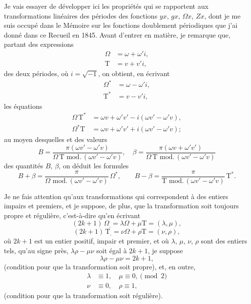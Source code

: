 \documentclass[11pt,a4paper]{article}
\providecommand{\md}{\,\mathrm{mod.}\,}
\begin{document}
Je vais essayer de d\'evelopper ici les propri\'et\'es qui se rapportent aux transformations lin\'eaires des p\'eriodes des fonctions $yx$, $gx$, $\Omega x$, $Zx$, dont je me suis occup\'e dans le M\'emoire sur les fonctions doublement p\'eriodiques que j'ai donn\'e dans ce Recueil en 1845. Avant d'entrer en mati\`ere, je remarque que, partant des expressions
\begin{align*}
\Omega &= \omega + \omega' i,\\
\mathrm{T} &= v + v' i,
\end{align*}
des deux p\'eriodes, o\`u $i = \sqrt{-1}$, on obtient, en \'ecrivant
\begin{align*}
\Omega^* &= \omega - \omega' i,\\
\mathrm{T}^* &= v - v' i,
\end{align*}
les \'equations
\begin{align*}
\Omega\, \mathrm{T}^* &= \omega v + \omega' v' - i (\omega v' - \omega' v),\\
\Omega^*\mathrm{T} &= \omega v + \omega' v' + i (\omega v' - \omega' v);
\end{align*}
au moyen desquelles et des valeurs
\[
B = \frac{\pi (\omega v' - \omega' v)}{\Omega\,\mathrm{T}\,\md(\omega v' - \omega' v)},\quad
\beta = \frac{\pi (\omega v + \omega' v')}{\Omega\,\mathrm{T}\,\md(\omega v' - \omega' v)}
\]
des quantit\'es $B$, $\beta$, on d\'eduit les formules
\[
B + \beta = \frac{\pi}{\Omega\,\md(\omega v' - \omega' v)}\,\Omega^*,\qquad
B - \beta = \frac{\pi}{\mathrm{T}\,\md(\omega v' - \omega' v)}\,\mathrm{T}^*.
\]

\medskip

Je ne fais attention qu'aux transformations qui correspondent \`a des entiers impairs et premiers, et je suppose, de plus, que la transformation soit toujours propre et r\'eguli\`ere, c'est-\`a-dire qu'en \'ecrivant
\[
(2k+1)\,\Omega_{,} = \lambda\Omega + \mu\mathrm{T} = (\lambda, \mu),
\]
\[
(2k+1)\,\mathrm{T}_{,} = \nu\Omega + \rho\mathrm{T} = (\nu, \rho),
\]
o\`u $2k+1$ est un entier positif, impair et premier, et o\`u $\lambda$, $\mu$, $\nu$, $\rho$ sont des entiers tels, qu'au signe pr\`es, $\lambda\rho - \mu\nu$ soit \'egal \`a $2k+1$, je suppose
\[ \lambda\rho - \mu\nu = 2k+1, \]
(condition pour que la transformation soit propre), et, en outre,
\begin{align*}
\lambda &\equiv 1,\quad \mu \equiv 0, \pmod{2}\\
\nu &\equiv 0,\quad \rho \equiv 1,
\end{align*}
(condition pour que la transformation soit r\'eguli\`ere).
\end{document}
